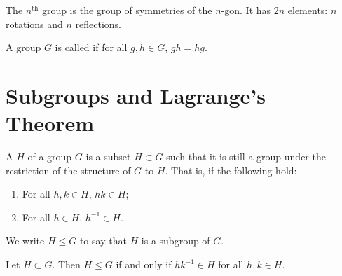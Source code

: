 \begin{example}
  The \(n^{\text{th}}\)  group is the group of symmetries of the \(n\)-gon.
  It has \(2n\) elements: \(n\) rotations and \(n\) reflections.

  \begin{centre}
  \end{centre}
\end{example}

\begin{definition}
  A group \(G\) is called  if for all \(g,h \in G\), \(gh = hg\).
\end{definition}



\section{Subgroups and Lagrange's Theorem}

\begin{definition}\label{def:group-theory:subgroup}
  A  \(H\) of a group \(G\) is a subset \(H \subset G\) such that it is still a group under the restriction of the structure of \(G\) to \(H\).
  That is, if the following hold:
  \begin{enumerate}
  \item For all \(h, k \in H\), \(hk \in H\);
  \item For all \(h \in H\), \(h^{-1} \in H\).
  \end{enumerate}


  We write \(H \leq G\) to say that \(H\) is a subgroup of \(G\).
\end{definition}


\begin{lemma}
  \label{lem:group-theory:subgroup-criterion}
  Let \(H \subset G\).
  Then \(H \leq G\) if and only if \(hk^{-1} \in H\) for all \(h,k \in H\).
\end{lemma}


